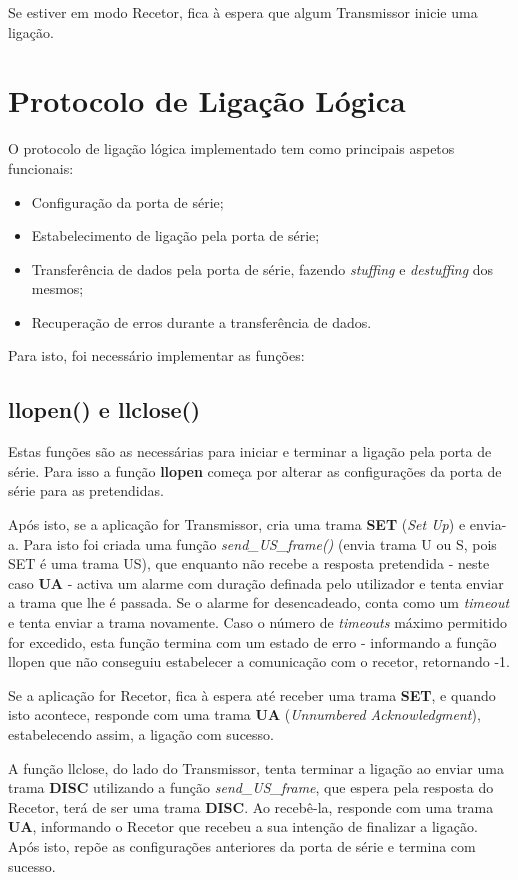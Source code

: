 \documentclass[11pt]{article}
\begin{document}
Se estiver em modo Recetor, fica à espera que algum Transmissor inicie uma ligação.
\newpage
\section{Protocolo de Ligação Lógica}

O protocolo de ligação lógica implementado tem como principais aspetos funcionais:
\begin{itemize}
\item Configuração da porta de série;
\item Estabelecimento de ligação pela porta de série;
\item Transferência de dados pela porta de série, fazendo \textit{stuffing} e \textit{destuffing} dos mesmos;
\item Recuperação de erros durante a transferência de dados.
\end{itemize}

Para isto, foi necessário implementar as funções:

\subsection{llopen() e llclose()}

Estas funções são as necessárias para iniciar e terminar a ligação pela porta de série.
Para isso a função \textbf{llopen} começa por alterar as configurações da porta de série para as pretendidas. 

Após isto, se a aplicação for Transmissor, cria uma trama \textbf{SET} (\textit{Set Up}) e envia-a. Para isto foi criada uma função \textit{send\_US\_frame()} (envia trama U ou S, pois SET é uma trama US), que enquanto não recebe a resposta pretendida - neste caso \textbf{UA} - activa um alarme com duração definada pelo utilizador e tenta enviar a trama que lhe é passada. Se o alarme for desencadeado, conta como um \textit{timeout} e tenta enviar a trama novamente. Caso o número de \textit{timeouts} máximo permitido for excedido, esta função termina com um estado de erro - informando a função llopen que não conseguiu estabelecer a comunicação com o recetor, retornando -1.

Se a aplicação for Recetor, fica à espera até receber uma trama \textbf{SET}, e quando isto acontece, responde com uma trama \textbf{UA} (\textit{Unnumbered Acknowledgment}), estabelecendo assim, a ligação com sucesso.

A função llclose, do lado do Transmissor, tenta terminar a ligação ao enviar uma trama \textbf{DISC} utilizando a função \textit{send\_US\_frame}, que espera pela resposta do Recetor, terá de ser uma trama \textbf{DISC}. Ao recebê-la, responde com uma trama \textbf{UA}, informando o Recetor que recebeu a sua intenção de finalizar a ligação. Após isto, repõe as configurações anteriores da porta de série e termina com sucesso.
\end{document}
